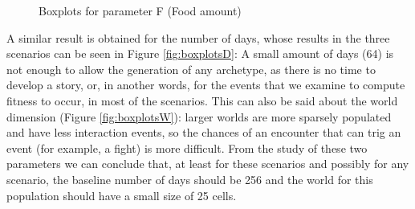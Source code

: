 \documentclass[runningheads,a4paper]{llncs}
\begin{document}
\begin{figure}
        \centering
        \caption{Boxplots for parameter F (Food amount)}\label{fig:boxplotsF}
\end{figure}

A similar result is obtained for the number of days, whose results in
the three scenarios can be seen in Figure \ref{fig:boxplotsD}: A small
amount of days (64) is not enough to allow the generation of any
archetype, as there is no time to develop a story, or, in another
words, for the events that we examine to compute fitness to occur, in
most of the scenarios. This can also be said
about the world dimension (Figure \ref{fig:boxplotsW}): larger worlds
are more sparsely populated and have less interaction events, so the chances of an encounter that can trig an event (for
example, a fight) is more difficult. %
From the study of these two parameters we can conclude that, at least
for these scenarios and possibly for any scenario, the baseline number
of days should be 256 and the world for this population should have a
small size of 25 cells. 
\end{document}
